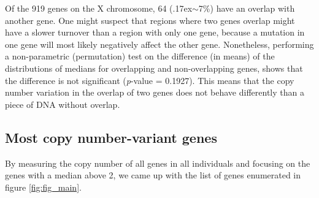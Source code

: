 \noindent Of the 919 genes on the X chromosome, 64 ({\raise.17ex\hbox{$\scriptstyle\sim$}}7\%) have an overlap with another gene. One might suspect that regions where two genes overlap might have a slower turnover than a region with only one gene, because a mutation in one gene will most likely negatively affect the other gene. Nonetheless, performing a non-parametric (permutation) test on the difference (in means) of the distributions of medians for overlapping and non-overlapping genes, shows that the difference is not significant (\textit{p}-value = 0.1927). This means that the copy number variation in the overlap of two genes does not behave differently than a piece of DNA without overlap. 




\subsection*{Most copy number-variant genes}

By measuring the copy number of all genes in all individuals and focusing on the genes with a median above 2, we came up with the list of genes enumerated in figure \ref{fig:fig_main}.

